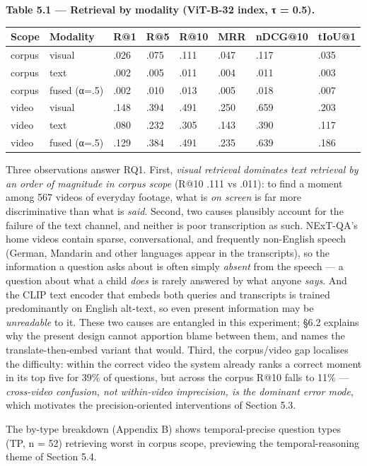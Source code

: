 \textbf{Table 5.1 --- Retrieval by modality (ViT-B-32 index, τ = 0.5).}

\begin{longtable}[]{@{}llllllll@{}}
\toprule\noalign{}
Scope & Modality & R@1 & R@5 & R@10 & MRR & nDCG@10 & tIoU@1 \\
\midrule\noalign{}
\endhead
\bottomrule\noalign{}
\endlastfoot
corpus & visual & .026 & .075 & .111 & .047 & .117 & .035 \\
corpus & text & .002 & .005 & .011 & .004 & .011 & .003 \\
corpus & fused (α=.5) & .002 & .010 & .013 & .005 & .018 & .007 \\
video & visual & .148 & .394 & .491 & .250 & .659 & .203 \\
video & text & .080 & .232 & .305 & .143 & .390 & .117 \\
video & fused (α=.5) & .129 & .384 & .491 & .235 & .639 & .186 \\
\end{longtable}

Three observations answer RQ1. First, \emph{visual retrieval dominates
text retrieval by an order of magnitude in corpus scope} (R@10 .111 vs
.011): to find a moment among 567 videos of everyday footage, what is
\emph{on screen} is far more discriminative than what is \emph{said}.
Second, two causes plausibly account for the failure of the text
channel, and neither is poor transcription as such. NExT-QA's home
videos contain sparse, conversational, and frequently non-English speech
(German, Mandarin and other languages appear in the transcripts), so the
information a question asks about is often simply \emph{absent} from the
speech --- a question about what a child \emph{does} is rarely answered
by what anyone \emph{says}. And the CLIP text encoder that embeds both
queries and transcripts is trained predominantly on English alt-text, so
even present information may be \emph{unreadable} to it. These two
causes are entangled in this experiment; §6.2 explains why the present
design cannot apportion blame between them, and names the
translate-then-embed variant that would. Third, the corpus/video gap
localises the difficulty: within the correct video the system already
ranks a correct moment in its top five for 39\% of questions, but across
the corpus R@10 falls to 11\% --- \emph{cross-video confusion, not
within-video imprecision, is the dominant error mode}, which motivates
the precision-oriented interventions of Section 5.3.

The by-type breakdown (Appendix B) shows temporal-precise question types
(TP, n = 52) retrieving worst in corpus scope, previewing the
temporal-reasoning theme of Section 5.4.

